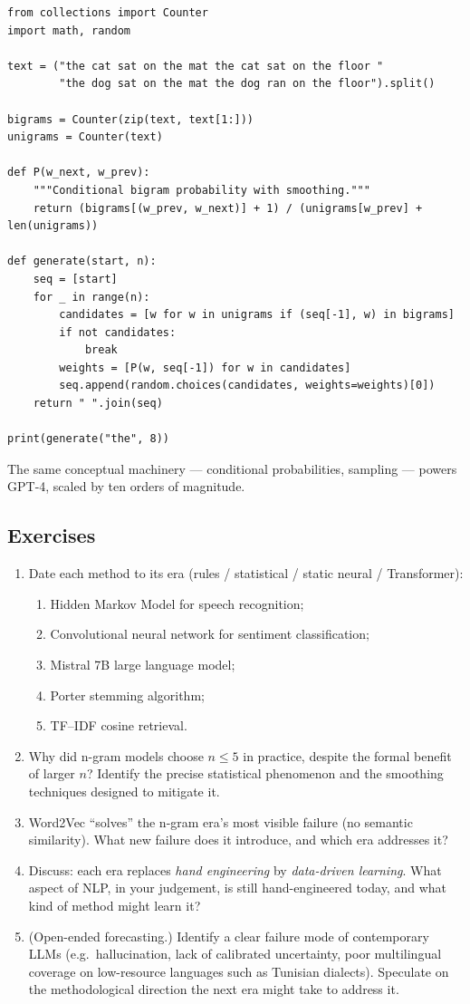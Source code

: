 \documentclass[12pt,a4paper]{report}
\theoremstyle{definition}
\theoremstyle{remark}
\begin{document}
\begin{lstlisting}
from collections import Counter
import math, random

text = ("the cat sat on the mat the cat sat on the floor "
        "the dog sat on the mat the dog ran on the floor").split()

bigrams = Counter(zip(text, text[1:]))
unigrams = Counter(text)

def P(w_next, w_prev):
    """Conditional bigram probability with smoothing."""
    return (bigrams[(w_prev, w_next)] + 1) / (unigrams[w_prev] + len(unigrams))

def generate(start, n):
    seq = [start]
    for _ in range(n):
        candidates = [w for w in unigrams if (seq[-1], w) in bigrams]
        if not candidates:
            break
        weights = [P(w, seq[-1]) for w in candidates]
        seq.append(random.choices(candidates, weights=weights)[0])
    return " ".join(seq)

print(generate("the", 8))
\end{lstlisting}

The same conceptual machinery --- conditional probabilities, sampling --- powers GPT-4, scaled by ten orders of magnitude.

\subsection{Exercises}
\begin{enumerate}
    \item Date each method to its era (rules / statistical / static neural / Transformer):
    \begin{enumerate}
        \item Hidden Markov Model for speech recognition;
        \item Convolutional neural network for sentiment classification;
        \item Mistral 7B large language model;
        \item Porter stemming algorithm;
        \item TF--IDF cosine retrieval.
    \end{enumerate}
    \item Why did n-gram models choose $n \le 5$ in practice, despite the formal benefit of larger $n$? Identify the precise statistical phenomenon and the smoothing techniques designed to mitigate it.
    \item Word2Vec ``solves'' the n-gram era's most visible failure (no semantic similarity). What new failure does it introduce, and which era addresses it?
    \item Discuss: each era replaces \emph{hand engineering} by \emph{data-driven learning}. What aspect of NLP, in your judgement, is still hand-engineered today, and what kind of method might learn it?
    \item (Open-ended forecasting.) Identify a clear failure mode of contemporary LLMs (e.g.\ hallucination, lack of calibrated uncertainty, poor multilingual coverage on low-resource languages such as Tunisian dialects). Speculate on the methodological direction the next era might take to address it.
\end{enumerate}
\end{document}
